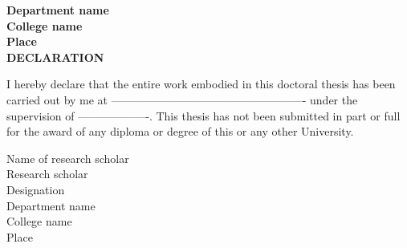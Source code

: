 \begin{center}
\bfseries
\large{Department name \\
College name \\
Place} \\
\vspace{1.5in}
\LARGE{DECLARATION} \\
\end{center}
\vspace{0.5in}
\normalsize{
I hereby declare that the entire work embodied in this doctoral thesis has been carried out by me at ---------------------------------------------------- under the supervision of -------------------. This thesis has not been submitted in part or full for the award of any diploma or degree of this or any other University.} \\
\vspace{0.5in}
\begin{flushleft}
\normalsize{Name of research scholar} \\
Research scholar \\
Designation \\
Department name\\
College name \\
Place \\
\end{flushleft}


